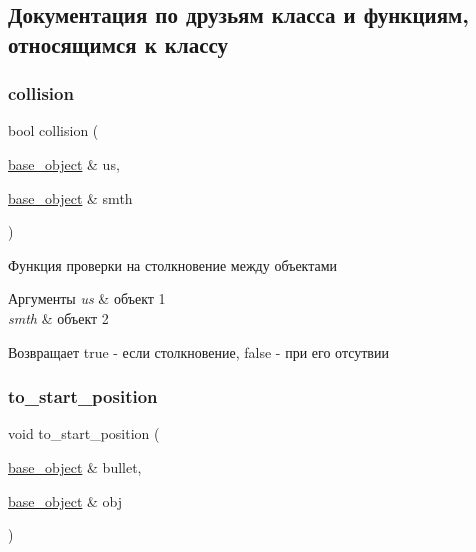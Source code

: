 \subsection{Документация по друзьям класса и функциям, относящимся к классу}
\mbox{\label{classbase__object_a38cd5b11f00fd31a9939b0c6e293d593}} 
\subsubsection{\texorpdfstring{collision}{collision}}
{\footnotesize\ttfamily bool collision (\begin{DoxyParamCaption}\item[{\mbox{\hyperlink{classbase__object}{base\+\_\+object}} \&}]{us,  }\item[{\mbox{\hyperlink{classbase__object}{base\+\_\+object}} \&}]{smth }\end{DoxyParamCaption})\hspace{0.3cm}{\ttfamily [friend]}}



Функция проверки на столкновение между объектами 


\begin{DoxyParams}{Аргументы}
{\em us} & объект 1 \\
\hline
{\em smth} & объект 2\\
\hline
\end{DoxyParams}
\begin{DoxyReturn}{Возвращает}
true -\/ если столкновение, false -\/ при его отсутвии 
\end{DoxyReturn}
\mbox{\label{classbase__object_a712e0cdc0ba13dc26f836adeccdc9264}} 
\subsubsection{\texorpdfstring{to\_start\_position}{to\_start\_position}}
{\footnotesize\ttfamily void to\+\_\+start\+\_\+position (\begin{DoxyParamCaption}\item[{\mbox{\hyperlink{classbase__object}{base\+\_\+object}} \&}]{bullet,  }\item[{\mbox{\hyperlink{classbase__object}{base\+\_\+object}} \&}]{obj }\end{DoxyParamCaption})\hspace{0.3cm}{\ttfamily [friend]}}




